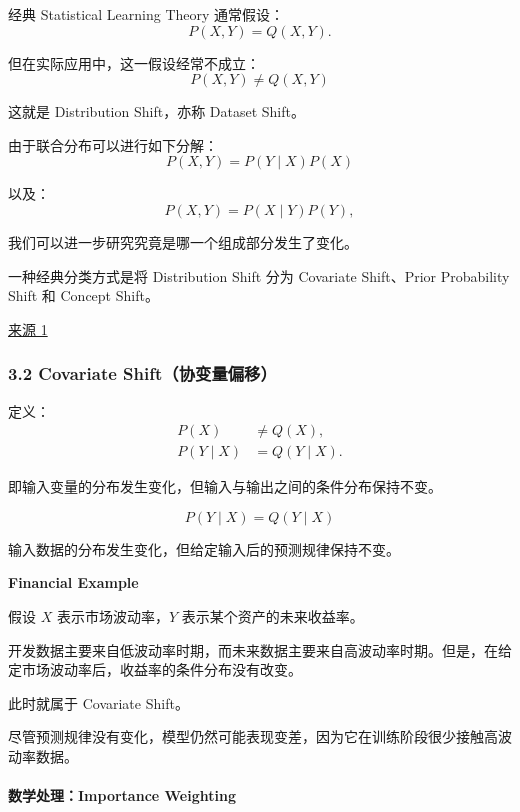 经典 Statistical Learning Theory 通常假设：
\[P(X,Y)=Q(X,Y).\]

但在实际应用中，这一假设经常不成立：
\[\boxed{P(X,Y)\neq Q(X,Y)}\]

这就是 Distribution Shift，亦称 Dataset Shift。

由于联合分布可以进行如下分解：
\[P(X,Y)=P(Y\mid X)P(X)\]

以及：
\[P(X,Y)=P(X\mid Y)P(Y),\]

我们可以进一步研究究竟是哪一个组成部分发生了变化。

一种经典分类方式是将 Distribution Shift 分为 Covariate Shift、Prior Probability Shift 和 Concept Shift。

\href{https://www.sciencedirect.com/science/article/pii/S0031320311002901}{来源 1}

\hypertarget{part-2-23-0001-covariate-shiftux534fux53d8ux91cfux504fux79fb}{%
\subsubsection{3.2 Covariate Shift（协变量偏移）}\label{part-2-23-0001-covariate-shiftux534fux53d8ux91cfux504fux79fb}}

定义：
\[\boxed{
\begin{aligned}
P(X)&\neq Q(X),\\
P(Y\mid X)&=Q(Y\mid X).
\end{aligned}
}\]

即输入变量的分布发生变化，但输入与输出之间的条件分布保持不变。


\[P(Y\mid X)=Q(Y\mid X)\]

输入数据的分布发生变化，但给定输入后的预测规律保持不变。

\textbf{Financial Example}

假设 \(X\) 表示市场波动率，\(Y\) 表示某个资产的未来收益率。

开发数据主要来自低波动率时期，而未来数据主要来自高波动率时期。但是，在给定市场波动率后，收益率的条件分布没有改变。

此时就属于 Covariate Shift。

尽管预测规律没有变化，模型仍然可能表现变差，因为它在训练阶段很少接触高波动率数据。

\hypertarget{part-2-23-0001-ux6570ux5b66ux5904ux7406importance-weighting}{%
\paragraph{数学处理：Importance Weighting}\label{part-2-23-0001-ux6570ux5b66ux5904ux7406importance-weighting}}

